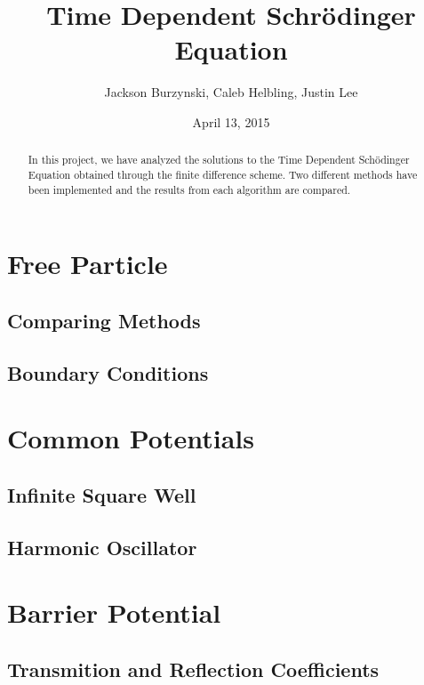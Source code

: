 \documentclass{article}
\begin{document}
\title{Time Dependent Schr\"{o}dinger Equation}
\author{Jackson Burzynski, Caleb Helbling, Justin Lee}
\date{April 13, 2015}

\maketitle

\begin{abstract}

In this project, we have analyzed the solutions to the Time Dependent Sch\"{o}dinger Equation obtained through the finite difference scheme. Two different methods have been implemented and the results from each algorithm are compared. 

\end{abstract}

\section{Free Particle}

\subsection{Comparing Methods}

\subsection{Boundary Conditions}

\section{Common Potentials}

\subsection{Infinite Square Well}

\subsection{Harmonic Oscillator}

\section{Barrier Potential}

\subsection{Transmition and Reflection Coefficients}
\end{document}
